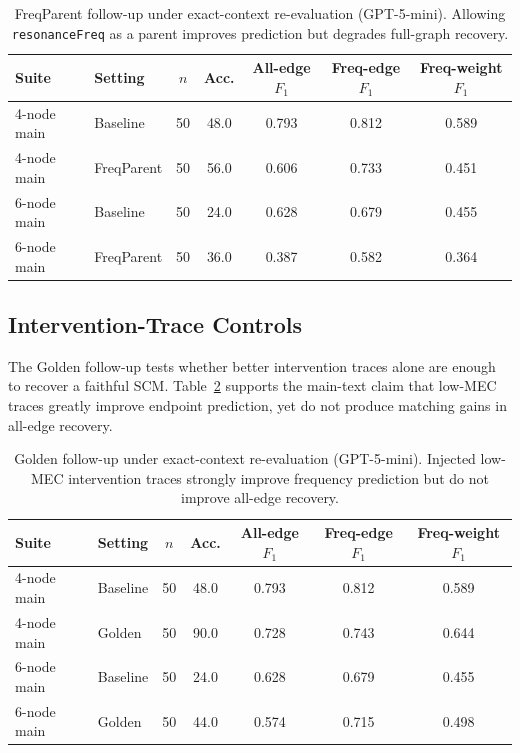 \begin{table}[!ht]
\centering
\small
\setlength{\tabcolsep}{4pt}
\begin{tabular}{llccccc}
\toprule
Suite & Setting & \(n\) & Acc. & All-edge \(F_1\) & Freq-edge \(F_1\) & Freq-weight \(F_1\) \\
\midrule
4-node main & Baseline & 50 & 48.0 & 0.793 & 0.812 & 0.589 \\
4-node main & FreqParent & 50 & 56.0 & 0.606 & 0.733 & 0.451 \\
6-node main & Baseline & 50 & 24.0 & 0.628 & 0.679 & 0.455 \\
6-node main & FreqParent & 50 & 36.0 & 0.387 & 0.582 & 0.364 \\
\bottomrule
\end{tabular}
\caption{FreqParent follow-up under exact-context re-evaluation (GPT-5-mini). Allowing \texttt{resonanceFreq} as a parent improves prediction but degrades full-graph recovery.}
\label{tab:freqparent_followup_metrics}
\end{table}

\subsection{Intervention-Trace Controls}
\label{app:intervention_trace_controls}

The Golden follow-up tests whether better intervention traces alone are enough
to recover a faithful SCM. Table~\ref{tab:golden_followup_metrics} supports
the main-text claim that low-MEC traces greatly improve endpoint prediction,
yet do not produce matching gains in all-edge recovery.

\begin{table}[!ht]
\centering
\small
\setlength{\tabcolsep}{4pt}
\begin{tabular}{llccccc}
\toprule
Suite & Setting & \(n\) & Acc. & All-edge \(F_1\) & Freq-edge \(F_1\) & Freq-weight \(F_1\) \\
\midrule
4-node main & Baseline & 50 & 48.0 & 0.793 & 0.812 & 0.589 \\
4-node main & Golden & 50 & 90.0 & 0.728 & 0.743 & 0.644 \\
6-node main & Baseline & 50 & 24.0 & 0.628 & 0.679 & 0.455 \\
6-node main & Golden & 50 & 44.0 & 0.574 & 0.715 & 0.498 \\
\bottomrule
\end{tabular}
\caption{Golden follow-up under exact-context re-evaluation (GPT-5-mini). Injected low-MEC intervention traces strongly improve frequency prediction but do not improve all-edge recovery.}
\label{tab:golden_followup_metrics}
\end{table}

